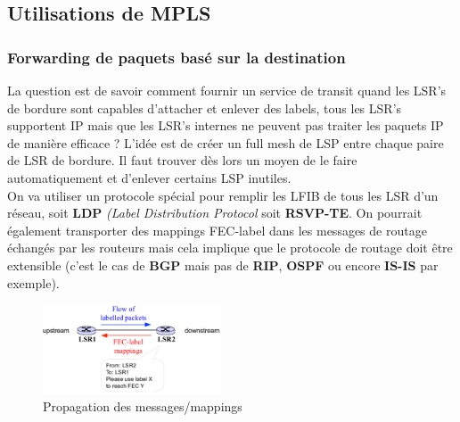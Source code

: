 \documentclass{article}
\begin{document}
\begin{sffamily}
\subsection{Utilisations de MPLS}

\subsubsection*{Forwarding de paquets basé sur la destination}

La question est de savoir comment fournir un service de transit quand les LSR's de bordure sont capables d'attacher et enlever 
des labels, tous les LSR's supportent IP mais que les LSR's internes ne peuvent pas traiter les paquets IP de manière efficace ? 
L'idée est de créer un full mesh de LSP entre chaque paire de LSR de bordure. Il faut trouver dès lors un moyen de le faire
automatiquement et d'enlever certains LSP inutiles. \\

On va utiliser un protocole spécial pour remplir les LFIB de tous les LSR d'un réseau, soit \textbf{LDP} \textit{(Label 
Distribution Protocol} soit \textbf{RSVP-TE}. On pourrait également transporter des mappings FEC-label dans les messages de 
routage échangés par les routeurs mais cela implique que le protocole de routage doit être extensible (c'est le cas de 
\textbf{BGP} mais pas de \textbf{RIP}, \textbf{OSPF} ou encore \textbf{IS-IS} par exemple).

\begin{figure}[h!]
    \begin{center}
    \includegraphics[width=200px]{img_012.pdf}
    \caption{Propagation des messages/mappings}
    \end{center}	
\end{figure}


\end{sffamily}
\end{document}
